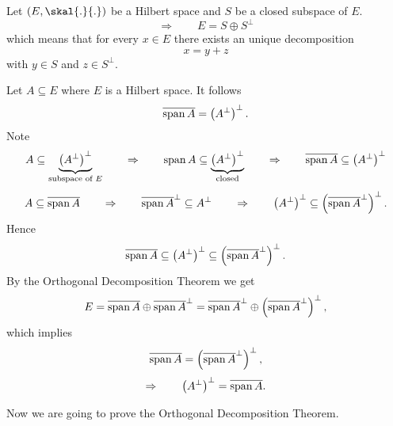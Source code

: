 
\begin{theorem}
	Let $(E, \skal{.}{.})$ be a Hilbert space and $S$ be a closed subspace of $E$. 
	\[
		\Rightarrow \qquad E = S \oplus S^{\perp}
	\]
	which means that for every $x \in E$ there exists an unique decomposition
	\[
		x = y + z
	\]
	with $y \in S$ and $z \in S^{\perp}$.
\end{theorem}
\begin{beispiel}
	Let $A \subseteq E$ where $E$ is a Hilbert space. It follows
	\[
		\overline{\operatorname{span}  A} = \left( A^{\perp} \right)^{\perp}.
	\]
	Note 
	\[
		A \subseteq \underset{\text{subspace of $E$}}{\underbrace{ \left( A^{\perp} \right)^{\perp}}} \qquad \Rightarrow \qquad \operatorname{span}  A \subseteq 
		\underset{\text{closed}}{\underbrace{ \left( A^{\perp} \right)^{\perp}}} \qquad \Rightarrow \qquad \overline{\operatorname{span}  A} \subseteq 
		\left( A^{\perp} \right)^{\perp}
	\]
	\[
		A \subseteq \overline{\operatorname{span}  A} \qquad \Rightarrow \qquad \overline{\operatorname{span}  A}^{\perp} \subseteq A^{\perp} \qquad \Rightarrow \qquad 
		\left( A^{\perp} \right)^{\perp} \subseteq \left( \overline{\operatorname{span}  A}^{\perp} \right)^{\perp}.
	\]
	Hence
	\[
		\overline{\operatorname{span}  A} \subseteq \left( A^{\perp} \right)^{\perp} \subseteq \left( \overline{\operatorname{span}  A}^{\perp} \right)^{\perp}.
	\]
	By the Orthogonal Decomposition Theorem we get
	\[
		E = \overline{\operatorname{span}  A} \oplus \overline{\operatorname{span}  A}^{\perp} = \overline{\operatorname{span}  A}^{\perp} \oplus \left( \overline{\operatorname{span}  A}^{\perp} \right)^{\perp}, 
	\]
	which implies
	\[
		\overline{\operatorname{span}  A} = \left( \overline{\operatorname{span}  A}^{\perp} \right)^{\perp},
	\]
	\[
		\Rightarrow \qquad \left( A^{\perp} \right)^{\perp} = \overline{\operatorname{span}  A}.
	\]
\end{beispiel}

Now we are going to prove the Orthogonal Decomposition Theorem.

